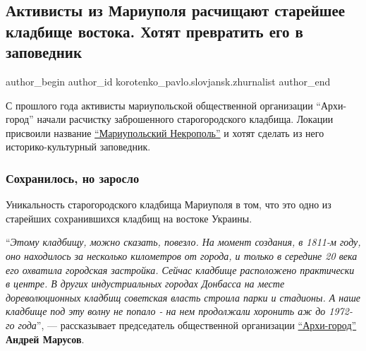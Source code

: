 
 
 
 
 
 
\subsection{Активисты из Мариуполя расчищают старейшее кладбище востока. Хотят превратить его в заповедник}
\label{sec:29_09_2021.stz.news.ua.svoi_city.1.aktivisty_mariupolja_kladbische_zapovednik}
 
\ifcmt
 author_begin
   author_id korotenko_pavlo.slovjansk.zhurnalist
 author_end
\fi


\begin{qqnagolos}

С прошлого года активисты мариупольской  общественной организации
\enquote{Архи-город} начали расчистку заброшенного старогородского кладбища.
Локации присвоили название
\href{https://www.facebook.com/groups/278185963354519}{\enquote{Мариупольский
Некрополь}} и хотят сделать из него историко-культурный заповедник.
	
\end{qqnagolos}

\subsubsection{Сохранилось, но заросло}

Уникальность старогородского кладбища Мариуполя в том, что это одно из
старейших сохранившихся кладбищ на востоке Украины.

\enquote{\em Этому кладбищу, можно сказать, повезло. На момент создания, в 1811-м
году, оно находилось за несколько километров от города, и только в середине 20
века его охватила городская застройка. Сейчас кладбище расположено практически
в центре. В других индустриальных городах Донбасса на месте дореволюционных
кладбищ советская власть строила парки и стадионы. А наше кладбище под эту
волну не попало - на нем продолжали хоронить аж до 1972-го года}, —
рассказывает председатель общественной организации
\href{https://www.facebook.com/arximisto}{\enquote{Архи-город}} \textbf{Андрей Марусов}.

